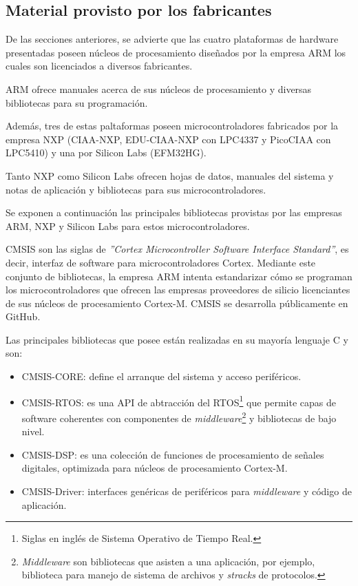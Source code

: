 \subsection{Material provisto por los fabricantes}

De las secciones anteriores, se advierte que las cuatro plataformas de hardware presentadas poseen núcleos de procesamiento diseñados por la empresa ARM \citep{ARM} los cuales son licenciados a diversos fabricantes.

ARM ofrece manuales acerca de sus núcleos de procesamiento y diversas bibliotecas para su programación.

Además, tres de estas paltaformas poseen microcontroladores fabricados por la empresa NXP (CIAA-NXP, EDU-CIAA-NXP con LPC4337 y PicoCIAA con LPC5410) y una por Silicon Labs (EFM32HG). 

Tanto NXP como Silicon Labs ofrecen hojas de datos, manuales del sistema y notas de aplicación y bibliotecas para sus microcontroladores.

Se exponen a continuación las principales bibliotecas provistas por las empresas ARM, NXP y Silicon Labs para estos microcontroladores.


CMSIS son las siglas de \emph{''Cortex Microcontroller Software Interface Standard''}, es decir, interfaz de software para microcontroladores Cortex. Mediante este conjunto de bibliotecas, la empresa ARM intenta estandarizar cómo se programan los microcontroladores que ofrecen las empresas proveedores de silicio licenciantes de sus núcleos de procesamiento Cortex-M. CMSIS se desarrolla públicamente en GitHub. 

Las principales bibliotecas que posee están realizadas en su mayoría lenguaje C y son:

\begin{itemize}
\item
CMSIS-CORE: define el arranque del sistema y acceso periféricos.
\item
CMSIS-RTOS: es una API de abtracción del RTOS\footnote{Siglas en inglés de Sistema Operativo de Tiempo Real.} que permite capas de software coherentes con componentes de \emph{middleware}\footnote{\emph{Middleware} son bibliotecas que asisten a una aplicación, por ejemplo, biblioteca para manejo de sistema de archivos y \emph{stracks} de protocolos.} y bibliotecas de bajo nivel.
\item
CMSIS-DSP: es una colección de funciones de procesamiento de señales digitales, optimizada para núcleos de procesamiento Cortex-M.
\item
CMSIS-Driver: interfaces genéricas de periféricos para \emph{middleware} y código de aplicación.
\end{itemize}

